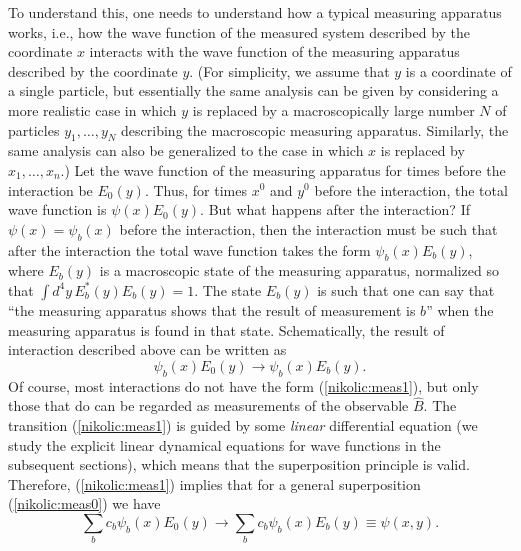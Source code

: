 \documentclass[12pt,twoside]{report} %
\begin{document}
To understand this, one needs to understand how a typical measuring apparatus works,
i.e., how the wave function of the measured system described by the coordinate $x$
interacts with the wave function of the measuring apparatus described by the coordinate $y$.
(For simplicity, we assume that $y$ is a coordinate of a single particle, but essentially
the same analysis can be given by considering a more realistic case in which
$y$ is replaced by a macroscopically large number $N$ of particles
$y_1,\ldots,y_N$ describing the macroscopic measuring apparatus. Similarly,
the same analysis can also be generalized to the case in which $x$ is replaced by
$x_1,\ldots,x_n$.)
Let the wave function of the measuring apparatus for times before the interaction
be $E_0(y)$. Thus, for times $x^0$ and $y^0$ before the interaction, the total wave function is
$\psi(x)E_0(y)$. But what happens after the interaction?
If $\psi(x)=\psi_b(x)$ before the interaction, then the interaction must be such that
after the interaction the total wave function takes the form $\psi_b(x)E_b(y)$, 
where $E_b(y)$ is a macroscopic state 
of the measuring apparatus, normalized so that $\int d^4y \, E^*_b(y) E_b(y) =1$.
The state $E_b(y)$ is such that
one can say that ``the measuring apparatus shows that the result of measurement is $b$''
when the measuring apparatus is found in that state.
Schematically, the result of interaction described above can be written as
\begin{equation}\label{nikolic:meas1}
\psi_b(x) E_0(y) \rightarrow \psi_b(x)E_b(y) .
\end{equation}
Of course, most interactions do not have the form (\ref{nikolic:meas1}), but only those
that do can be regarded as measurements of the observable $\hat{B}$.
The transition (\ref{nikolic:meas1}) is guided by some {\em linear} differential equation
(we study the explicit linear dynamical equations for wave functions in the subsequent sections),
which means that the superposition principle is valid.
Therefore, (\ref{nikolic:meas1}) implies that for a general superposition (\ref{nikolic:meas0})
we have
\begin{equation}\label{nikolic:meas2}
\sum_b c_b \psi_b(x) E_0(y) \rightarrow \sum_b c_b \psi_b(x)E_b(y) \equiv \psi(x,y).
\end{equation}
\end{document}
